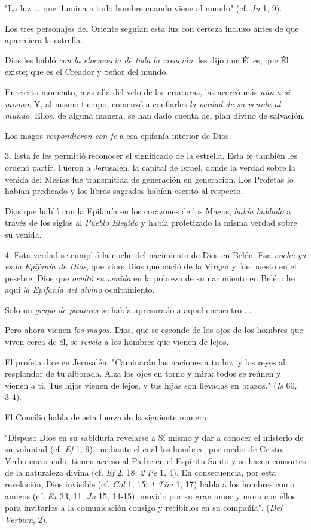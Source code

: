 \begin{body}
"La luz ... que ilumina a todo hombre cuando viene al mundo" (cf. \emph{Jn} 1, 9).

Los tres personajes del Oriente seguían esta luz con certeza incluso antes de que apareciera la estrella.

Dios les habló \emph{con la elocuencia de toda la creación}: les dijo que Él es, que Él existe; que es el Creador y Señor del mundo.

En cierto momento, más allá del velo de las criaturas, las acercó más \emph{aún a sí mismo.} Y, al mismo tiempo, comenzó a confiarles \emph{la verdad de su venida al mundo.} Ellos, de alguna manera, se han dado cuenta del plan divino de salvación.

Los magos \emph{respondieron con fe} a esa epifanía interior de Dios.

3. Esta fe les permitió reconocer el significado de la estrella. Esta fe también les ordenó partir. Fueron a Jerusalén, la capital de Israel, donde la verdad sobre la venida del Mesías fue transmitida de generación en generación. Los Profetas lo habían predicado y los libros sagrados habían escrito al respecto.

Dios que habló con la Epifanía en los corazones de los Magos, \emph{había hablado} a través de los siglos al \emph{Pueblo Elegido} y había profetizado la misma verdad sobre su venida.

4. Esta verdad se cumplió la noche del nacimiento de Dios en Belén. Esa \emph{noche ya es la Epifanía de Dios}, que vino: Dios que nació de la Virgen y fue puesto en el pesebre. Dios que \emph{ocultó su venida} en la pobreza de su nacimiento en Belén: he aquí \emph{la Epifanía del divino} ocultamiento.

Solo un \emph{grupo de pastores se} había apresurado a aquel encuentro ...

Pero ahora vienen \emph{los magos.} Dios, que se esconde de los ojos de los hombres que viven cerca de él, se \emph{revela} a los hombres que vienen de lejos.

El profeta dice en Jerusalén: "Caminarán las naciones a tu luz, y los reyes al resplandor de tu alborada. Alza los ojos en torno y mira: todos se reúnen y vienen a ti. Tus hijos vienen de lejos, y tus hijas son llevadas en brazos." (\emph{Is} 60, 3-4).

El Concilio habla de esta fuerza de la siguiente manera:

"Dispuso Dios en su sabiduría revelarse a Sí mismo y dar a conocer el misterio de su voluntad (cf. \emph{Ef} 1, 9), mediante el cual los hombres, por medio de Cristo, Verbo encarnado, tienen acceso al Padre en el Espíritu Santo y se hacen consortes de la naturaleza divina (cf. \emph{Ef} 2, 18; \emph{2 Pe} 1, 4). En consecuencia, por esta revelación, Dios invisible (cf. \emph{Col} 1, 15; \emph{1 Tim} 1, 17) habla a los hombres como amigos (cf. \emph{Ex} 33, 11; \emph{Jn} 15, 14-15), movido por su gran amor y mora con ellos, para invitarlos a la comunicación consigo y recibirlos en su compañía". (\emph{Dei Verbum}, 2).


\end{body}
